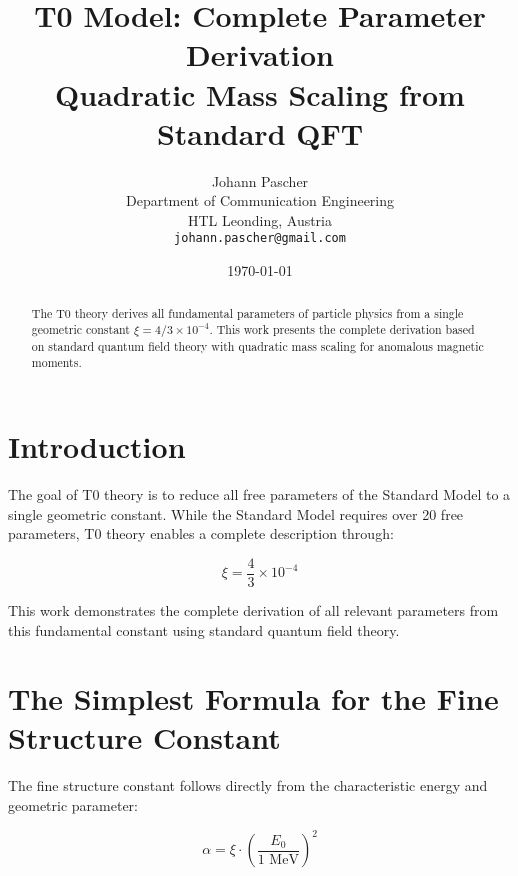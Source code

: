 \documentclass[12pt,a4paper]{article}
\begin{document}
	
	\title{T0 Model: Complete Parameter Derivation \\
		\large Quadratic Mass Scaling from Standard QFT}
	\author{Johann Pascher\\
		Department of Communication Engineering\\
		HTL Leonding, Austria\\
		\texttt{johann.pascher@gmail.com}}
	\date{\today}
	
	\maketitle
	
	\begin{abstract}
		The T0 theory derives all fundamental parameters of particle physics from a single geometric constant $\xi = 4/3 \times 10^{-4}$. This work presents the complete derivation based on standard quantum field theory with quadratic mass scaling for anomalous magnetic moments.
	\end{abstract}
	
	\tableofcontents
	\newpage
	
	\section{Introduction}
	
	The goal of T0 theory is to reduce all free parameters of the Standard Model to a single geometric constant. While the Standard Model requires over 20 free parameters, T0 theory enables a complete description through:
	
	\begin{equation}
		\boxed{\xi = \frac{4}{3} \times 10^{-4}}
	\end{equation}
	
	This work demonstrates the complete derivation of all relevant parameters from this fundamental constant using standard quantum field theory.
	
	\section{The Simplest Formula for the Fine Structure Constant}
	
	The fine structure constant follows directly from the characteristic energy and geometric parameter:
	
	\begin{equation}
		\boxed{\alpha = \xi \cdot \left(\frac{E_0}{1 \text{ MeV}}\right)^2}
	\end{equation}
	
\end{document}
